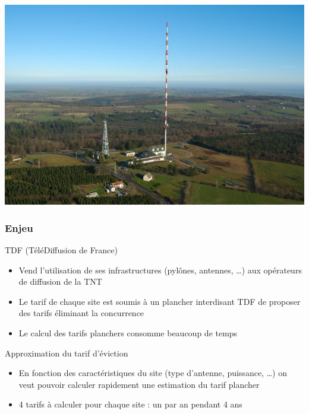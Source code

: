 \documentclass{beamer}
\begin{document}
\begin{frame}
\begin{center}
    \includegraphics[height=.5\textheight]{pylone.jpg}
  \end{center}
\end{frame}

\begin{frame}
\frametitle{Enjeu}
\begin{block}{TDF (TéléDiffusion de France)}
  \begin{itemize}
  \item Vend l'utilisation de ses infrastructures (pylônes, antennes, \dots)
    aux opérateurs de diffusion de la TNT
  \item Le tarif de chaque site est soumis à un plancher 
    interdisant TDF de proposer des tarifs éliminant la concurrence
  \item Le calcul des tarifs planchers consomme beaucoup de temps
  \end{itemize}
\end{block}
\begin{block}{Approximation du tarif d'éviction}
  \begin{itemize}
  \item En fonction des caractéristiques du site (type d'antenne, puissance, \dots)
    on veut pouvoir calculer rapidement une estimation du tarif plancher
  \item 4 tarifs à calculer pour chaque site :
    un par an pendant 4 ans
  \end{itemize}
\end{block}
\end{frame}
\end{document}
